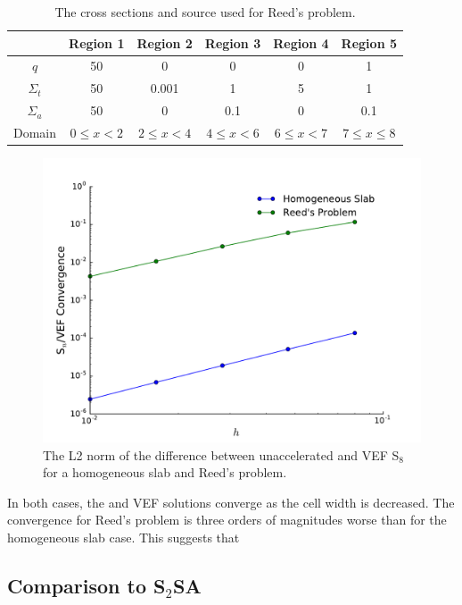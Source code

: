 	\begin{table} \centering
		\begin{tabular}{|c|c|c|c|c|c|}
			\hline
			& Region 1 & Region 2 & Region 3 & Region 4 & Region 5 \\ 
			\hline 
			$q$ & 50 & 0 & 0 & 0 & 1 \\ 
			$\Sigma_t$ & 50 & 0.001 & 1 & 5 & 1 \\ 
			$\Sigma_a$ & 50 & 0 & 0.1 & 0 & 0.1 \\ 
			\hline 
			Domain & $0 \leq x < 2$ & $2 \leq x < 4$ & $4\leq x < 6$ &
				$6 \leq x < 7$ & $7 \leq x \leq 8$\\ 
			\hline 
		\end{tabular}
		\caption{The cross sections and source used for Reed's problem.}
		\label{tab:reedXS}
	\end{table}

	\begin{figure} \centering
		\includegraphics[width=.75\textwidth]{figs/convergence.pdf}
		\caption{The L2 norm of the difference between unaccelerated and VEF S$_8$ for a homogeneous slab and Reed's problem. }
		\label{fig:reed}
	\end{figure}

In both cases, the \SN and VEF solutions converge as the cell width is decreased. The convergence for Reed's problem is three orders of magnitudes worse than for the homogeneous slab case. This suggests that 

\subsection{Comparison to S$_2$SA}

